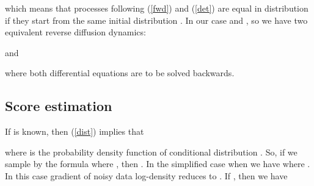 \documentclass{article}
\begin{document}
which means that processes following (\ref{fwd}) and (\ref{det}) are equal in distribution if they start from the same initial distribution . In our case  and , so we have two equivalent reverse diffusion dynamics:



and



where both differential equations are to be solved backwards.






\subsection{Score estimation}
\label{app:score_estimation}

If  is known, then (\ref{dist}) implies that



where  is the probability density function of conditional distribution . So, if we sample  by the formula  where , then . In the simplified case when  we have  where . In this case gradient of noisy data log-density reduces to . If , then we have
\end{document}
